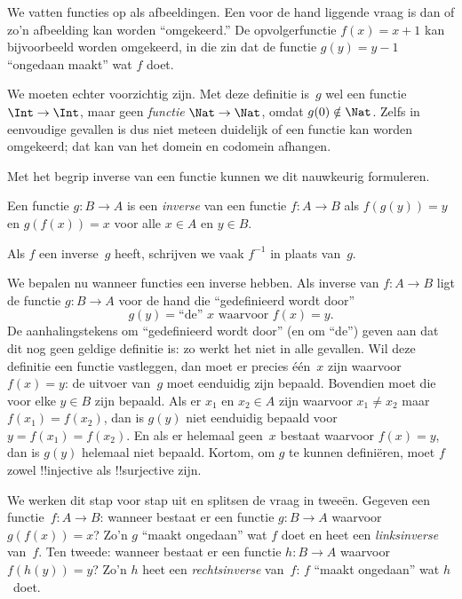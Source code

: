 \documentclass[../../../include/open-logic-section]{subfiles}
\begin{document}

\begin{explain}
We vatten functies op als afbeeldingen. Een voor de hand liggende vraag is
dan of zo'n afbeelding kan worden ``omgekeerd.'' De opvolgerfunctie
$f(x) = x + 1$ kan bijvoorbeeld worden omgekeerd, in die zin dat de
functie $g(y) = y - 1$ ``ongedaan maakt'' wat $f$ doet.

We moeten echter voorzichtig zijn. Met deze definitie is~$g$ wel een
functie $\Int \to \Int$, maar geen \emph{functie} $\Nat \to \Nat$,
omdat $g(0) \notin \Nat$. Zelfs in eenvoudige gevallen is dus niet
meteen duidelijk of een functie kan worden omgekeerd; dat kan van het
domein en codomein afhangen.

Met het begrip inverse van een functie kunnen we dit nauwkeurig formuleren.
\end{explain}

\begin{defn}
Een functie $g \colon B \to A$ is een \emph{inverse} van een functie
$f \colon A \to B$ als $f(g(y)) = y$ en $g(f(x)) = x$ voor alle
$x \in A$ en $y \in B$.
\end{defn}

Als $f$ een inverse~$g$ heeft, schrijven we vaak $f^{-1}$ in plaats
van~$g$.

\begin{explain}
We bepalen nu wanneer functies een inverse hebben. Als inverse van
$f\colon A \to B$ ligt de functie $g\colon B \to A$ voor de hand die
``gedefinieerd wordt door''
\[
g(y) = \text{``de'' $x$ waarvoor $f(x) = y$.}
\]
De aanhalingstekens om ``gedefinieerd wordt door'' (en om ``de'')
geven aan dat dit nog geen geldige definitie is: zo werkt het niet in
alle gevallen. Wil deze definitie een functie
vastleggen, dan moet er precies één~$x$ zijn waarvoor $f(x) = y$:
de uitvoer van~$g$ moet eenduidig zijn bepaald. Bovendien moet die
voor elke $y \in B$ zijn bepaald. Als er $x_1$ en $x_2 \in A$ zijn
waarvoor $x_1 \neq x_2$ maar $f(x_1) = f(x_2)$, dan is $g(y)$ niet
eenduidig bepaald voor $y = f(x_1) = f(x_2)$. En als er helemaal
geen~$x$ bestaat waarvoor $f(x) = y$, dan is $g(y)$ helemaal
niet bepaald. Kortom, om $g$ te kunnen definiëren, moet $f$ zowel
!!{injective} als !!{surjective} zijn.

We werken dit stap voor stap uit en splitsen de vraag in tweeën.
Gegeven een functie~$f\colon A \to B$: wanneer bestaat er een functie
$g\colon B \to A$ waarvoor $g(f(x)) = x$? Zo'n $g$ ``maakt ongedaan''
wat $f$ doet en heet een \emph{linksinverse} van~$f$. Ten tweede:
wanneer bestaat er een functie $h\colon B \to A$ waarvoor
$f(h(y)) = y$? Zo'n $h$ heet een \emph{rechtsinverse} van~$f$:
$f$ ``maakt ongedaan'' wat $h$~doet.
\end{explain}
\end{document}
